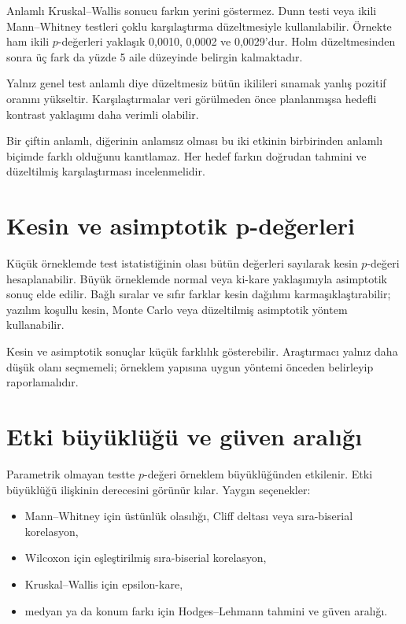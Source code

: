 Anlamlı Kruskal--Wallis sonucu farkın yerini göstermez. Dunn testi veya ikili
Mann--Whitney testleri çoklu karşılaştırma düzeltmesiyle kullanılabilir.
Örnekte ham ikili $p$-değerleri yaklaşık 0,0010, 0,0002 ve 0,0029'dur. Holm
düzeltmesinden sonra üç fark da yüzde 5 aile düzeyinde belirgin kalmaktadır.

Yalnız genel test anlamlı diye düzeltmesiz bütün ikilileri sınamak yanlış
pozitif oranını yükseltir. Karşılaştırmalar veri görülmeden önce planlanmışsa
hedefli kontrast yaklaşımı daha verimli olabilir.

\begin{mistakebox}
Bir çiftin anlamlı, diğerinin anlamsız olması bu iki etkinin birbirinden
anlamlı biçimde farklı olduğunu kanıtlamaz. Her hedef farkın doğrudan tahmini
ve düzeltilmiş karşılaştırması incelenmelidir.
\end{mistakebox}

\section{Kesin ve asimptotik p-değerleri}

Küçük örneklemde test istatistiğinin olası bütün değerleri sayılarak kesin
$p$-değeri hesaplanabilir. Büyük örneklemde normal veya ki-kare yaklaşımıyla
asimptotik sonuç elde edilir. Bağlı sıralar ve sıfır farklar kesin dağılımı
karmaşıklaştırabilir; yazılım koşullu kesin, Monte Carlo veya düzeltilmiş
asimptotik yöntem kullanabilir.

Kesin ve asimptotik sonuçlar küçük farklılık gösterebilir. Araştırmacı yalnız
daha düşük olanı seçmemeli; örneklem yapısına uygun yöntemi önceden belirleyip
raporlamalıdır.

\section{Etki büyüklüğü ve güven aralığı}

Parametrik olmayan testte $p$-değeri örneklem büyüklüğünden etkilenir. Etki
büyüklüğü ilişkinin derecesini görünür kılar. Yaygın seçenekler:

\begin{itemize}
  \item Mann--Whitney için üstünlük olasılığı, Cliff deltası veya sıra-biserial korelasyon,
  \item Wilcoxon için eşleştirilmiş sıra-biserial korelasyon,
  \item Kruskal--Wallis için epsilon-kare,
  \item medyan ya da konum farkı için Hodges--Lehmann tahmini ve güven aralığı.
\end{itemize}

